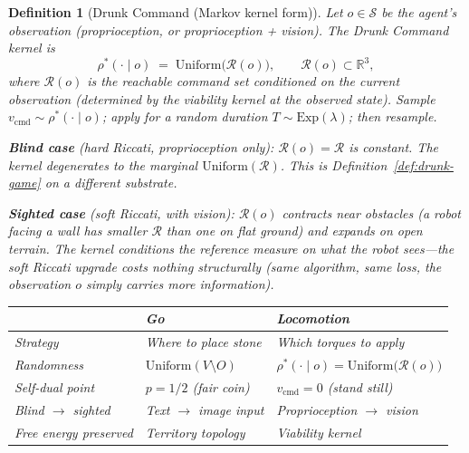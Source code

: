 \documentclass[11pt,a4paper]{article}
\newtheorem{definition}[theorem]{Definition}
\newcommand{\R}{\mathbb{R}}
\newcommand{\cS}{\mathcal{S}}
\newcommand{\cR}{\mathcal{R}}
\begin{document}
\begin{definition}[Drunk Command (Markov kernel form)]
\label{def:drunk-command}
Let $o \in \cS$ be the agent's observation
(proprioception, or proprioception + vision).
The \emph{Drunk Command kernel} is
\begin{equation}\label{eq:drunk-command-kernel}
  \rho^*(\cdot \mid o)
  \;=\;
  \mathrm{Uniform}\!\bigl(\cR(o)\bigr),
  \qquad
  \cR(o) \subset \R^3,
\end{equation}
where $\cR(o)$ is the reachable command set
\emph{conditioned on the current observation}
(determined by the viability kernel
at the observed state).
Sample $v_{\mathrm{cmd}} \sim \rho^*(\cdot \mid o)$;
apply for a random duration
$T \sim \mathrm{Exp}(\lambda)$; then resample.

\medskip\noindent
\textbf{Blind case} (hard Riccati, proprioception only):\;
$\cR(o) = \cR$ is constant.
The kernel degenerates to the marginal
$\mathrm{Uniform}(\cR)$.
This is Definition~\ref{def:drunk-game}
on a different substrate.

\medskip\noindent
\textbf{Sighted case} (soft Riccati, with vision):\;
$\cR(o)$ contracts near obstacles
(a robot facing a wall has smaller $\cR$
than one on flat ground)
and expands on open terrain.
The kernel conditions the reference measure
on what the robot sees---the soft Riccati upgrade
costs nothing structurally
(same algorithm, same loss,
the observation $o$ simply carries more information).

\medskip
\begin{center}
\begin{tabular}{@{}lll@{}}
\toprule
 & \textbf{Go} & \textbf{Locomotion} \\
\midrule
Strategy
  & Where to place stone
  & Which torques to apply \\
Randomness
  & $\mathrm{Uniform}(V \setminus O)$
  & $\rho^*(\cdot \mid o)
    = \mathrm{Uniform}\!\bigl(\cR(o)\bigr)$ \\
Self-dual point
  & $p = 1/2$ (fair coin)
  & $v_{\mathrm{cmd}} = 0$ (stand still) \\
Blind $\to$ sighted
  & Text $\to$ image input
  & Proprioception $\to$ vision \\
Free energy preserved
  & Territory topology
  & Viability kernel \\
\bottomrule
\end{tabular}
\end{center}
\end{definition}

\end{document}
